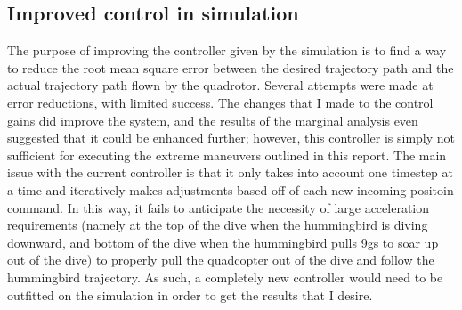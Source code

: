 \documentclass[onecolumn,10pt]{IEEEtran}
\begin{document}

\subsection{Improved control in simulation}
The purpose of improving the controller given by the simulation is to find a way to reduce the root mean square error between the desired trajectory path and the actual trajectory path flown by the quadrotor. Several attempts were made at error reductions, with limited success. The changes that I made to the control gains did improve the system, and the results of the marginal analysis even suggested that it could be enhanced further; however, this controller is simply not sufficient for executing the extreme maneuvers outlined in this report. The main issue with the current controller is that it only takes into account one timestep at a time and iteratively makes adjustments based off of each new incoming positoin command. In this way, it fails to anticipate the necessity of large acceleration requirements (namely at the top of the dive when the hummingbird is diving downward, and bottom of the dive when the hummingbird pulls 9gs to soar up out of the dive) to properly pull the quadcopter out of the dive and follow the hummingbird trajectory. As such, a completely new controller would need to be outfitted on the simulation in order to get the results that I desire.
\end{document}
